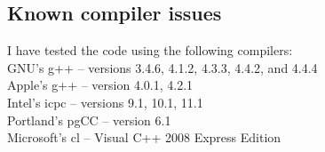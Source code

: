 \documentclass[twoside,letterpaper,11pt]{article}
\begin{document}
\subsection{Known compiler issues}
\label{Install_Issues}















I have tested the code using the following compilers:\\
$\quad$\\
GNU's g++ -- versions 3.4.6, 4.1.2, 4.3.3, 4.4.2, and 4.4.4\\
Apple's g++ -- version 4.0.1, 4.2.1 \\
Intel's icpc -- versions 9.1, 10.1, 11.1\\
Portland's pgCC -- version 6.1\\
Microsoft's cl -- Visual C++ 2008 Express Edition\\
\end{document}
